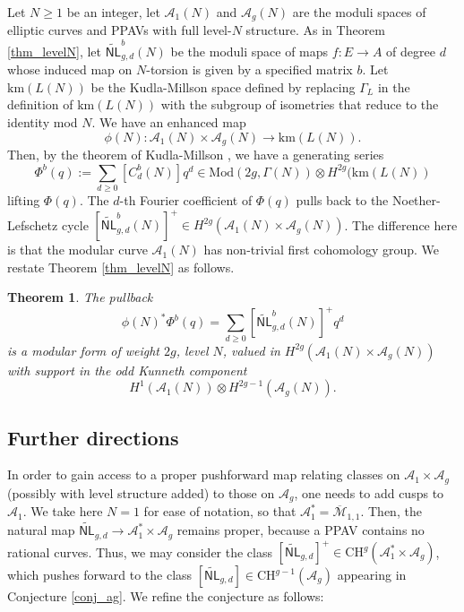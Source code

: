 \documentclass[12pt]{amsart}
\def\cA{\mathcal{A}}
\def\bC{\mathbb{C}}
\def\cM{\mathcal{M}}
\def\barM{\overline{\cM}}
\DeclareMathOperator{\Cusp}{Cusp}
\newcommand{\A}{\mathcal A}
\newcommand{\CH}{\mathrm{CH}}
\newcommand{\Mod}{\mathrm{Mod}}
\newcommand{\wNL}{{\widetilde{\mathsf{NL}}}}
\newcommand{\km}{\mathrm{km}}
\newtheorem{thm}{Theorem}[section]
\theoremstyle{definition}
\begin{document}
Let $N\ge 1$ be an integer, let $\cA_1(N)$ and $\cA_g(N)$ are the moduli spaces of elliptic curves and PPAVs with full level-$N$ structure. As in Theorem \ref{thm_levelN}, let $\wNL^b_{g,d}(N)$ be the moduli space of maps $f:E\to A$ of degree $d$ whose induced map on $N$-torsion is given by a specified matrix $b$. Let $\km(L(N))$ be the Kudla-Millson space defined by replacing $\Gamma_L$ in the definition of $\km(L(N))$ with the subgroup of isometries that reduce to the identity mod $N$. We have an enhanced map
\begin{equation*}
\phi(N): \A_1(N)\times \A_g(N) \to \km(L(N)).
\end{equation*}
Then, by the theorem of Kudla-Millson \cite{km}, we have a generating series
\begin{equation*}
    \Phi^{b}(q):=\sum_{d\ge0}[C^b_d(N)]q^d \in \Mod(2g,\Gamma(N))\otimes H^{2g}(\km(L(N))
\end{equation*}
lifting $\Phi(q)$. The $d$-th Fourier coefficient of $\Phi(q)$ pulls back to the Noether-Lefschetz cycle $[\wNL^b_{g,d}(N)]^+\in H^{2g}(\cA_1(N)\times\cA_g(N))$. The difference here is that the modular curve $\A_1(N)$ has non-trivial first cohomology group. We restate Theorem \ref{thm_levelN} as follows.
\begin{thm}
    The pullback 
    \begin{equation*}
        \phi(N)^* \Phi^{b}(q)=\sum_{d\ge 0}[\wNL^b_{g,d}(N)]^+q^d
    \end{equation*}
    is a modular form of weight $2g$, level $N$, valued in $H^{2g}(\A_1(N)\times \A_g(N))$ with support in the odd Kunneth component
    $$H^1(\A_1(N))\otimes H^{2g-1}(\A_g(N)).$$
\end{thm}

\subsection{Further directions}

In order to gain access to a proper pushforward map relating classes on $\cA_1\times\cA_g$ (possibly with level structure added) to those on $\cA_g$, one needs to add cusps to $\cA_1$. We take here $N=1$ for ease of notation, so that $\cA_1^{*}=\barM_{1,1}$. Then, the natural map $\wNL_{g,d}\to \cA_1^{*}\times\cA_g$ remains proper, because a PPAV contains no rational curves. Thus, we may consider the class $[\wNL_{g,d}]^+\in \CH^{g}(\cA_1^{*}\times\cA_g)$, which pushes forward to the class $[\wNL_{g,d}]\in \CH^{g-1}(\cA_g)$ appearing in Conjecture \ref{conj_ag}. We refine the conjecture as follows:
\end{document}
